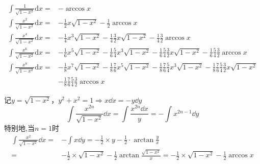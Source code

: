 \begin{theorem}[单位圆根式分子型]
    \vspace{-15pt}
    \begin{align*}
        \int\frac{1}{\sqrt{1-x^{2}}}\mathrm{d}x=&-\arccos x\\
        \int\frac{x^2}{\sqrt{1-x^2}}\mathrm{d}x=&-\frac{1}{2}x\sqrt{1-x^2}-\frac{1}{2}\arccos x\\
        \int\frac{x^4}{\sqrt{1-x^2}}\mathrm{d}x=&-\frac{1}{4}x^3\sqrt{1-x^2}-\frac{1}{4}\frac{3}{2}x\sqrt{1-x^2}-\frac{1}{4}\frac{3}{2}\arccos x\\
        \int\frac{x^{6}}{\sqrt{1-x^{2}}}\mathrm{d}x=&-\frac{1}{6}x^5\sqrt{1-x^2}-\frac{1}{6}\frac{5}{4}x^3\sqrt{1-x^2}-\frac{1}{6}\frac{5}{4}\frac{3}{2}x\sqrt{1-x^2}-\frac{1}{6}\frac{5}{4}\frac{3}{2}\arccos x\\
        \int\frac{x^{8}}{\sqrt{1-x^{2}}}\mathrm{d}x=&-\frac{1}{8}x^{7}\sqrt{1-x^{2}}-\frac{1}{8}\frac{7}{6}x^{5}\sqrt{1-x^{2}}-\frac{1}{8}\frac{7}{6}\frac{5}{4}x^{3}\sqrt{1-x^{2}}-\frac{1}{8}\frac{7}{6}\frac{5}{4}\frac{3}{2}x\sqrt{1-x^{2}}\\
        &-\frac{1}{8}\frac{7}{6}\frac{5}{4}\frac{3}{2}\arccos x
    \end{align*}
\end{theorem}
记$y=\sqrt{1-x^{2}}$，$y^{2}+x^{2}=1\Rightarrow x\dd x=-y\dd y$
\[\int\frac{x^{2n}}{\sqrt{1-x^{2}}}\dd x=\int\frac{x^{2n}\dd x}{y}=-\int x^{2n-1}\dd y\]
特别地,当$n=1$时
\begin{align*}
\int\frac{x^{2}}{\sqrt{1-x^{2}}}\dd x=&-\int x\dd y=-\frac{1}{2}\times y-\frac{1}{2}\cdot\arctan\frac{y}{x}\\=&-\frac{1}{2}\times\sqrt{1-x^{2}}-\frac{1}{2}\arctan\frac{\sqrt{1-x^{2}}}{x}=-\frac{1}{2}\times\sqrt{1-x^{2}}-\frac{1}{2}\arccos x
\end{align*}

